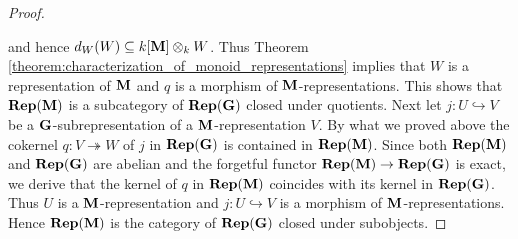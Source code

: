 \begin{proof}
\begin{center}
\end{center}
and hence $d_W(W)\subseteq k[\mathbf{M}]\otimes_kW$. Thus Theorem \ref{theorem:characterization_of_monoid_representations} implies that $W$ is a representation of $\mathbf{M}$ and $q$ is a morphism of $\mathbf{M}$-representations. This shows that $\mathbf{Rep}(\mathbf{M})$ is a subcategory of $\mathbf{Rep}(\mathbf{G})$ closed under quotients. Next let $j:U\hookrightarrow V$ be a $\mathbf{G}$-subrepresentation of a $\mathbf{M}$-representation $V$. By what we proved above the cokernel $q:V\twoheadrightarrow W$ of $j$ in $\mathbf{Rep}(\mathbf{G})$ is contained in $\mathbf{Rep}(\mathbf{M})$. Since both $\mathbf{Rep}(\mathbf{M})$ and $\mathbf{Rep}(\mathbf{G})$ are abelian and the forgetful functor $\mathbf{Rep}(\mathbf{M})\rightarrow \mathbf{Rep}(\mathbf{G})$ is exact, we derive that the kernel of $q$ in $\mathbf{Rep}(\mathbf{M})$ coincides with its kernel in $\mathbf{Rep}(\mathbf{G})$. Thus $U$ is a $\mathbf{M}$-representation and $j:U\hookrightarrow V$ is a morphism of $\mathbf{M}$-representations. Hence $\mathbf{Rep}(\mathbf{M})$ is the category of $\mathbf{Rep}(\mathbf{G})$ closed under subobjects.
\end{proof}

